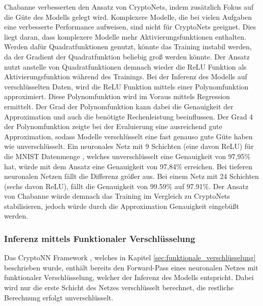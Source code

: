 Chabanne \etal \cite{P-55} verbesserten den Ansatz von CryptoNets, indem zusätzlich Fokus auf die Güte des Modells gelegt wird. 
Komplexere Modelle, die bei vielen Aufgaben eine verbesserte Performance aufweisen, sind nicht für CryptoNets geeignet.
Dies liegt daran, dass komplexere Modelle mehr Aktivierungsfunktionen enthalten. 
Werden dafür Quadratfunktionen genutzt, könnte das Training instabil werden, da der Gradient der Quadratfunktion beliebig groß werden könnte.
Der Ansatz nutzt anstelle von Quadratfunktionen demnach wieder die ReLU Funktion als Aktivierungsfunktion während des Trainings.
Bei der Inferenz des Modells auf verschlüsselten Daten, wird die ReLU Funktion mittels einer Polynomfunktion approximiert.
Diese Polynomfunktion wird im Voraus mittels Regression ermittelt. 
Der Grad der Polynomfunktion kann dabei die Genauigkeit der Approximation und auch die benötigte Rechenleistung beeinflussen.
Der Grad 4 der Polynomfunktion zeigte bei der Evaluierung eine ausreichend gute Approximation, sodass Modelle verschlüsselt eine fast genauso gute Güte haben wie unverschlüsselt.
Ein neuronales Netz mit 9 Schichten (eine davon ReLU) für die MNIST Datenmenge \cite{D-MNIST}, welches unverschlüsselt eine Genauigkeit von 97,95\% hat, würde mit dem Ansatz eine Genauigkeit von 97,84\% erreichen.
Bei tieferen neuronalen Netzen fällt die Differenz größer aus. 
Bei einem Netz mit 24 Schichten (sechs davon ReLU), fällt die Genauigkeit von 99.59\% auf 97.91\%.
Der Ansatz von Chabanne \etal \cite{P-55} würde demnach das Training im Vergleich zu CryptoNets \cite{P-54} stabilisieren, jedoch würde durch die Approximation Genauigkeit eingebüßt werden.


\subsubsection*{Inferenz mittels Funktionaler Verschlüsselung}
Das CryptoNN Framework \cite{P-53}, welches in Kapitel \ref{sec:funktionale_verschlüsselung} beschrieben wurde, enthält bereits den Forward-Pass eines neuronalen Netzes mit funktionaler Verschlüsselung, welcher der Inferenz des Modells entspricht.
Dabei wird nur die erste Schicht des Netzes verschlüsselt berechnet, die restliche Berechnung erfolgt unverschlüsselt.

